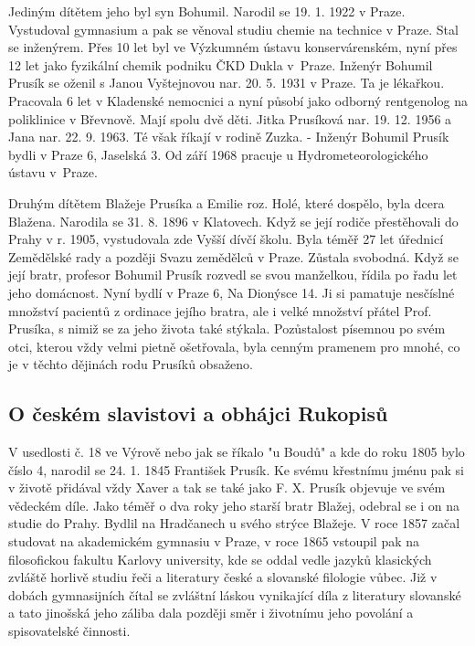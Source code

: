 \documentclass[../dejiny-rodu-prusiku.tex]{subfiles}
\begin{document}
Jediným dítětem jeho byl syn Bohumil. Narodil se 19. 1. 1922 v Praze. Vystudoval gymnasium a pak se věnoval studiu chemie na technice v Praze. Stal se inženýrem. Přes 10 let byl ve Výzkumném ústavu konservárenském, nyní přes 12 let jako
fyzikální chemik podniku ČKD Dukla v Praze. Inženýr Bohumil Prusík se oženil s Janou Vyštejnovou nar. 20. 5. 1931 v Praze. Ta je lékařkou. Pracovala 6 let v Kladenské nemocnici a nyní působí jako odborný rentgenolog na poliklinice v Břevnově. Mají spolu dvě děti. Jitka Prusíková nar. 19. 12. 1956 a Jana nar. 22. 9. 1963. Té však říkají v rodině Zuzka. - Inženýr Bohumil Prusík bydli v Praze 6, Jaselská 3. Od září 1968 pracuje u Hydrometeorologického ústavu v Praze.

Druhým dítětem Blažeje Prusíka a Emilie roz. Holé, kte­ré dospělo, byla dcera Blažena. Narodila se 31. 8. 1896 v Klatovech. Když se její rodiče přestěhovali do Prahy v r. 1905, vystudovala zde Vyšší dívčí školu. Byla téměř 27 let úřednicí Zemědělské rady a později Svazu zemědělců v Praze. Zůstala svobodná. Když se její bratr, profesor Bohumil Prusík rozvedl se svou manželkou, ří­dila po řadu let jeho domácnost. Nyní bydlí v Praze 6, Na Dionýsce 14. Ji si pamatuje nesčíslné množství pa­cientů z ordinace jejího bratra, ale i velké množství přátel Prof. Prusíka, s nimiž se za jeho života také stýkala. Pozůstalost písemnou po svém otci, kterou vždy velmi pietně ošetřovala, byla cenným pramenem pro mnohé, co je v těchto dějinách rodu Prusíků obsaženo.

\subsection{O českém slavistovi a obhájci Rukopisů}
V usedlosti č. 18 ve Výrově nebo jak se říkalo "u Boudů" a kde do roku 1805 bylo číslo 4, narodil se 24. 1. 1845 František Prusík. Ke svému křestnímu jménu pak si v ži­votě přidával vždy Xaver a tak se také jako F. X. Prusík objevuje ve svém vědeckém díle. Jako téměř o dva roky jeho starší bratr Blažej, odebral se i on na studie do Prahy. Bydlil na Hradčanech u svého strýce Blažeje. V roce 1857 začal studovat na akademickém gymnasiu v Praze, v roce 1865 vstoupil pak na filosofickou fakultu Karlovy university, kde se oddal vedle jazyků kla­sických zvláště horlivě studiu řeči a literatury české a slovanské filologie vůbec. Již v dobách gymnasijních čítal se zvláštní láskou vynikající díla z literatury slo­vanské a tato jinošská jeho záliba dala později směr i životnímu jeho povolání a spisovatelské činnosti.
\end{document}
